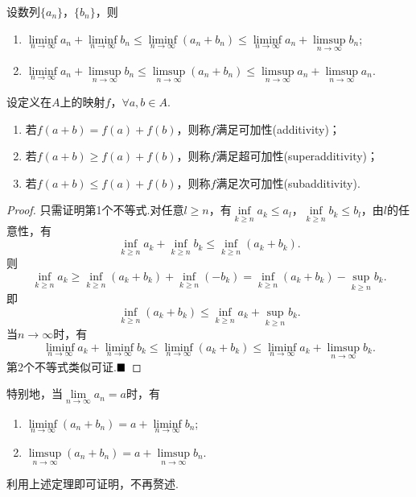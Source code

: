 \begin{theorem}[上极限的次可加性与下极限的超可加性]
	设数列$\{a_n\}$，$\{b_n\}$，则
	\begin{enumerate}
		\item $\liminf\limits_{n \to \infty}a_n+\liminf\limits_{n \to \infty}b_n\leqslant\liminf\limits_{n \to \infty}(a_n+b_n)\leqslant\liminf\limits_{n \to \infty}a_n+\limsup\limits_{n \to \infty}b_n$;
		\item $\liminf\limits_{n \to \infty}a_n+\limsup\limits_{n \to \infty}b_n\leqslant\limsup\limits_{n \to \infty}(a_n+b_n)\leqslant\limsup\limits_{n \to \infty}a_n+\limsup\limits_{n \to \infty}a_n$.
	\end{enumerate}
\end{theorem}
\begin{remark}
	设定义在$A$上的映射$f$，$\forall a,b\in A$.
	\begin{enumerate}
		\item 若$f(a+b)=f(a)+f(b)$，则称$f$满足{\heiti 可加性}(additivity)；
		\item 若$f(a+b)\geqslant f(a)+f(b)$，则称$f$满足{\heiti 超可加性}(superadditivity)；
		\item 若$f(a+b)\leqslant f(a)+f(b)$，则称$f$满足{\heiti 次可加性}(subadditivity).
	\end{enumerate}
\end{remark}
\begin{proof}
	只需证明第1个不等式.对任意$l\geqslant n$，有$\inf\limits_{k\geqslant n}a_k\leqslant a_l$，$\inf\limits_{k\geqslant n}b_k\leqslant b_l$，由$l$的任意性，有
	$$\inf\limits_{k\geqslant n}a_k+\inf\limits_{k\geqslant n}b_k\leqslant \inf\limits_{k\geqslant n}(a_k+b_k).$$
	则$$\inf\limits_{k\geqslant n}a_k\geqslant\inf\limits_{k\geqslant n}(a_k+b_k)+\inf\limits_{k\geqslant n}(-b_k)=\inf\limits_{k\geqslant n}(a_k+b_k)-\sup\limits_{k\geqslant n}b_k.$$
	即$$\inf\limits_{k\geqslant n}(a_k+b_k)\leqslant\inf\limits_{k\geqslant n}a_k+\sup\limits_{k\geqslant n}b_k.$$
	当$n\to\infty$时，有
	$$\liminf\limits_{n \to \infty}a_k+\liminf\limits_{n \to \infty}b_k\leqslant\liminf\limits_{n \to \infty}(a_k+b_k)\leqslant\liminf\limits_{n \to \infty}a_k+\limsup\limits_{n \to \infty}b_k.$$
	第2个不等式类似可证.$\hfill\blacksquare$
\end{proof}
\begin{remark}
	特别地，当$\lim\limits_{n\to\infty}a_n=a$时，有
	\begin{enumerate}
		\item $\liminf\limits_{n\to\infty}(a_n+b_n)=a+\liminf\limits_{n \to \infty}b_n$;
		\item $\limsup\limits_{n\to\infty}(a_n+b_n)=a+\limsup\limits_{n \to \infty}b_n$.
	\end{enumerate}
	利用上述定理即可证明，不再赘述.
\end{remark}


